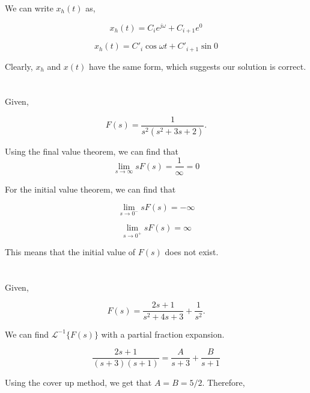 \documentclass[12pt]{article}
\numberwithin{equation}{section}
\begin{document}
  We can write $ x_h(t) $ as,

  \begin{equation}
    x_h(t) = C_i e^{j\omega} + C_{i+1} e^{0}
  \end{equation}

  \begin{equation}
    x_h(t) = C'_i \cos\omega t + C'_{i+1} \sin 0
  \end{equation}

  Clearly, $ x_h $ and $ x(t) $ have the same form, which suggests our solution is correct.

  \section{}

  Given,

  \[
      F(s) = \frac{1}{s ^2 (s ^2 + 3s + 2)}
    .\]

  Using the final value theorem, we can find that
  \begin{equation}
    \lim_{s \rightarrow \infty} sF(s) = \frac{1}{\infty} = 0
  \end{equation}

  For the initial value theorem, we can find that

  \begin{equation}
    \lim_{s \rightarrow 0^-} sF(s) = -\infty
  \end{equation}

  \begin{equation}
    \lim_{s \rightarrow 0^+} sF(s) = \infty
  \end{equation}

  This means that the initial value of $ F(s) $ does not exist.

  \section{}

  Given,

  \[
      F(s) = \frac{2s + 1}{s ^2 + 4s + 3} + \frac{1}{s ^2}
    .\]

  We can find $ \mathcal{L}^{-1}\{F(s)\} $ with a partial fraction expansion.

  \begin{equation}
    \frac{2s + 1}{(s + 3)(s + 1)} = \frac{A}{s + 3} + \frac{B}{s + 1}
  \end{equation}

  Using the cover up method, we get that $ A = B = 5/2. $ Therefore,
\end{document}
